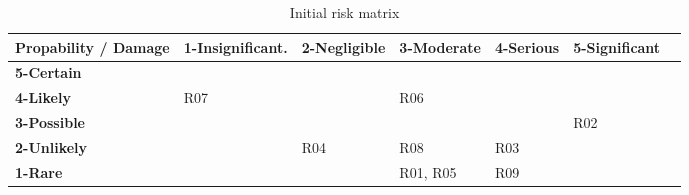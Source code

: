 \begin{table}[H]
  \centering
  \scriptsize
  \begin{tabular}{|m{27mm}|m{24mm}|m{20mm}|m{20mm}|m{20mm}|m{20mm}|@{}m{0pt}@{}}
    \hline 	\bf Propability / Damage & \bf 1-Insignificant. 	& \bf 2-Negligible 				& \bf 3-Moderate 			& \bf 4-Serious 			& \bf 5-Significant 	& \\ [10pt]
    \hline 	\bf 5-Certain 			& \cellcolor{yellow!50} 	& \cellcolor{yellow!50} 	& \cellcolor{orange!50} 			& \cellcolor{red!50} 		& \cellcolor{red!50} 			& \\ [10pt]
			\bf 4-Likely 			& \cellcolor{green!50} R07 	& \cellcolor{yellow!50} 	& \cellcolor{yellow!50} R06 	& \cellcolor{orange!50} 		& \cellcolor{red!50} 			& \\ [10pt]
			\bf 3-Possible 				& \cellcolor{green!50} 		& \cellcolor{green!50} 		& \cellcolor{yellow!50} 		& \cellcolor{yellow!50} 	& \cellcolor{orange!50} R02 		& \\ [10pt]
			\bf 2-Unlikely 			& \cellcolor{green!50} 	& \cellcolor{green!50} R04 	& \cellcolor{green!50} R08 		& \cellcolor{yellow!50} R03 & \cellcolor{yellow!50} 		& \\ [10pt]
			\bf 1-Rare 			& \cellcolor{green!50} 		& \cellcolor{green!50} 		& \cellcolor{green!50} R01, R05 & \cellcolor{green!50} R09 	& \cellcolor{green!50} 		& \\ [10pt]
    \hline
  \end{tabular} \\
  \caption{Initial risk matrix}
\end{table}

